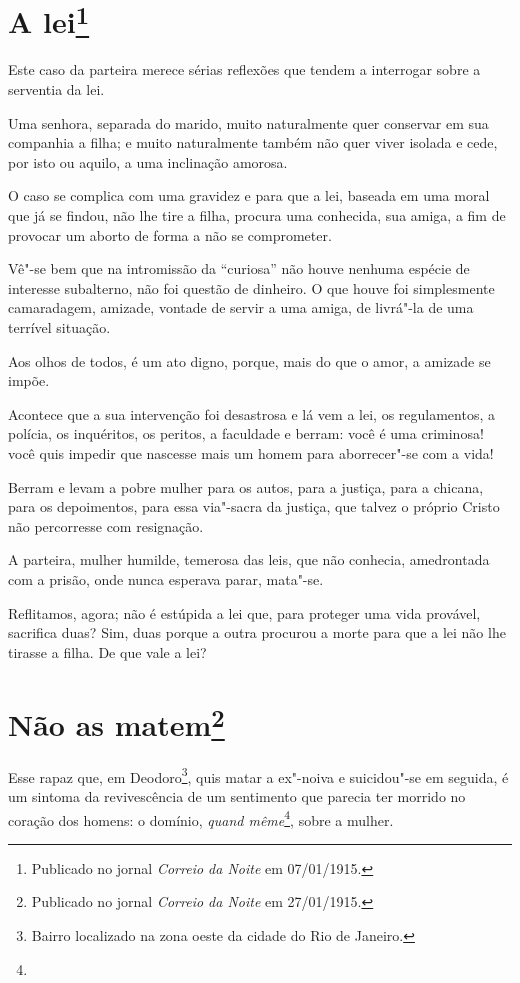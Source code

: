 \chapter[A lei]{A lei\footnote[*]{Publicado no jornal \emph{Correio da Noite} em 07/01/1915.}}

Este caso da parteira merece sérias reflexões que tendem a interrogar
sobre a serventia da lei.

Uma senhora, separada do marido, muito naturalmente quer conservar em
sua companhia a filha; e muito naturalmente também não quer viver
isolada e cede, por isto ou aquilo, a uma inclinação amorosa.

O caso se complica com uma gravidez e para que a lei, baseada em uma
moral que já se findou, não lhe tire a filha, procura uma conhecida, sua
amiga, a fim de provocar um aborto de forma a não se comprometer.

Vê"-se bem que na intromissão da ``curiosa'' não houve nenhuma espécie de
interesse subalterno, não foi questão de dinheiro. O que houve foi
simplesmente camaradagem, amizade, vontade de servir a uma amiga, de
livrá"-la de uma terrível situação.

Aos olhos de todos, é um ato digno, porque, mais do que o amor, a
amizade se impõe.

Acontece que a sua intervenção foi desastrosa e lá vem a lei, os
regulamentos, a polícia, os inquéritos, os peritos, a faculdade e
berram: você é uma criminosa! você quis impedir que nascesse mais um
homem para aborrecer"-se com a vida!

Berram e levam a pobre mulher para os autos, para a justiça, para a
chicana, para os depoimentos, para essa via"-sacra da justiça, que talvez
o próprio Cristo não percorresse com resignação.

A parteira, mulher humilde, temerosa das leis, que não conhecia,
amedrontada com a prisão, onde nunca esperava parar, mata"-se.

Reflitamos, agora; não é estúpida a lei que, para proteger uma vida
provável, sacrifica duas? Sim, duas porque a outra procurou a morte para
que a lei não lhe tirasse a filha. De que vale a lei?

\chapter[Não as matem]{Não as matem\footnote[*]{Publicado no jornal \emph{Correio da Noite} em 27/01/1915.}}

Esse rapaz que, em Deodoro\footnote{Bairro localizado na zona oeste da
  cidade do Rio de Janeiro.}, quis matar a ex"-noiva e suicidou"-se em
seguida, é um sintoma da revivescência de um sentimento que parecia ter
morrido no coração dos homens: o domínio, \emph{quand même}\footnote{},
sobre a mulher.

